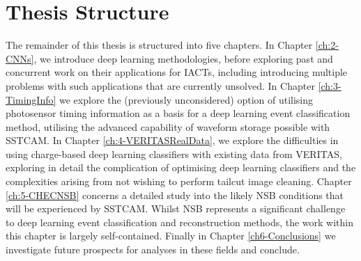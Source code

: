 \section{Thesis Structure}
The remainder of this thesis is structured into five chapters. In Chapter \ref{ch:2-CNNs}, we introduce deep learning methodologies, before exploring past and concurrent work on their applications for IACTs, including introducing multiple problems with such applications that are currently unsolved. In Chapter \ref{ch:3-TimingInfo} we explore the (previously unconsidered) option of utilising photosensor timing information as a basis for a deep learning event classification method, utilising the advanced capability of waveform storage possible with SSTCAM. In Chapter \ref{ch:4-VERITASRealData}, we explore the difficulties in using charge-based deep learning classifiers with existing data from VERITAS, exploring in detail the complication of optimising deep learning classifiers and the complexities arising from not wishing to perform tailcut image cleaning. Chapter \ref{ch:5-CHECNSB} concerns a detailed study into the likely NSB conditions that will be experienced by SSTCAM. Whilst NSB represents a significant challenge to deep learning event classification and reconstruction methods, the work within this chapter is largely self-contained. Finally in Chapter \ref{ch6-Conclusions} we investigate future prospects for analyses in these fields and conclude.